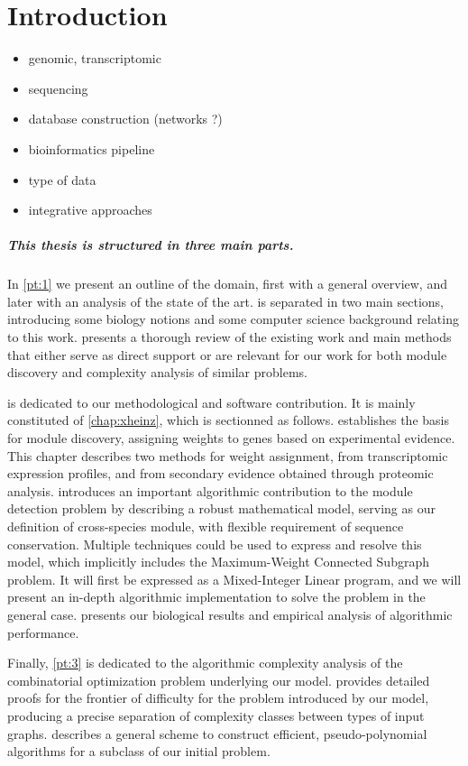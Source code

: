 \chapter*{Introduction}
\label{chap:intro}

	\begin{itemize}
		\item genomic, transcriptomic
		\item sequencing
		\item database construction (networks ?)

		\item bioinformatics pipeline
		\item type of data
		\item integrative approaches
	\end{itemize}

\paragraph*{This thesis is structured in three main parts.}


In \cref{pt:1} we present an outline of the domain, first with a general overview, and later with an analysis of the state of the art.
 is separated in two main sections, introducing some biology notions and some computer science background relating to this work.
 presents a thorough review of the existing work and main methods that either serve as direct support or are relevant for our work for both module discovery and complexity analysis of similar problems.

 is dedicated to our methodological and software contribution. It is mainly constituted of \cref{chap:xheinz}, which is sectionned as follows.
 establishes the basis for module discovery, assigning weights to genes based on experimental evidence.
This chapter describes two methods for weight assignment, from transcriptomic expression profiles, and from secondary evidence obtained through proteomic analysis.
 introduces an important algorithmic contribution to the module detection problem by describing a robust mathematical model, serving as our definition of cross-species module, with flexible requirement of sequence conservation.
Multiple techniques could be used to express and resolve this model, which implicitly includes the Maximum-Weight Connected Subgraph problem.
It will first be expressed as a Mixed-Integer Linear program, and we will present an in-depth algorithmic implementation to solve the problem in the general case.
 presents our biological results and empirical analysis of algorithmic performance.

Finally, \cref{pt:3} is dedicated to the algorithmic complexity analysis of the combinatorial optimization problem underlying our model.
 provides detailed proofs for the frontier of difficulty for the problem introduced by our model, producing a precise separation of complexity classes between types of input graphs.
 describes a general scheme to construct efficient, pseudo-polynomial algorithms for a subclass of our initial problem.
